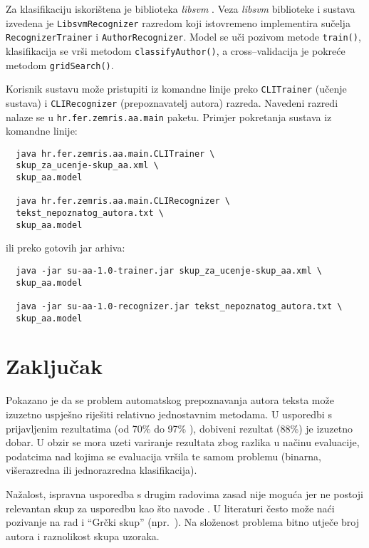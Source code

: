 \documentclass{article}
\begin{document}

Za klasifikaciju iskorištena je biblioteka \emph{libsvm} \citep{CC01a}. Veza
\emph{libsvm} biblioteke i sustava izvedena je \texttt{LibsvmRecognizer}
razredom koji istovremeno implementira sučelja \texttt{RecognizerTrainer} i
\texttt{AuthorRecognizer}. Model se uči pozivom metode \texttt{train()},
klasifikacija se vrši metodom \texttt{classifyAuthor()}, a cross--validacija je
pokreće metodom \texttt{gridSearch()}.

Korisnik sustavu može pristupiti iz komandne linije preko \texttt{CLITrainer}
(učenje sustava) i \texttt{CLIRecognizer} (prepoznavatelj autora) razreda. Navedeni razredi nalaze se u
\texttt{hr.fer.zemris.aa.main} paketu. Primjer pokretanja sustava iz
komandne linije:
\begin{verbatim}
  java hr.fer.zemris.aa.main.CLITrainer \
  skup_za_ucenje-skup_aa.xml \
  skup_aa.model
  
  java hr.fer.zemris.aa.main.CLIRecognizer \
  tekst_nepoznatog_autora.txt \
  skup_aa.model
\end{verbatim}
ili preko gotovih jar arhiva:
\begin{verbatim}
  java -jar su-aa-1.0-trainer.jar skup_za_ucenje-skup_aa.xml \
  skup_aa.model

  java -jar su-aa-1.0-recognizer.jar tekst_nepoznatog_autora.txt \
  skup_aa.model
\end{verbatim}
\section{Zaključak}
Pokazano je da se problem automatskog prepoznavanja autora teksta može izuzetno
uspješno riješiti relativno jednostavnim metodama. U usporedbi s prijavljenim
rezultatima (od 70\% do 97\%
\citep{coyotl2006authorship,keselj2003n,luyckx2005shallow,stamatatos2001computer,stamatatos1999automatic}),
dobiveni rezultat (88\%) je izuzetno dobar. U obzir se mora uzeti variranje
rezultata zbog razlika u načinu evaluacije, podatcima nad kojima se evaluacija
vršila te samom problemu (binarna, višerazredna ili jednorazredna
klasifikacija).

Nažalost, ispravna usporedba s drugim radovima zasad nije moguća jer ne postoji
relevantan skup za usporedbu kao što navode \citep{zhao2005effective}. U
literaturi često može naći pozivanje na rad
\citep{stamatatos2001computer,stamatatos1999automatic} i ``Grčki skup''
(npr.~\citep{keselj2003n}). Na složenost problema bitno utječe broj autora i
raznolikost skupa uzoraka.
\end{document}

